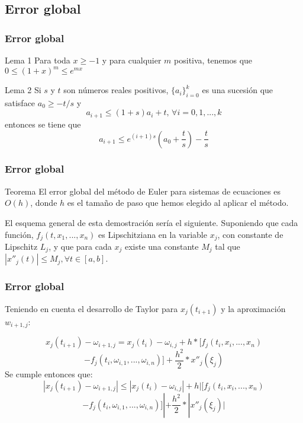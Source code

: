\documentclass{beamer}
\begin{document}
\subsection{Error global}
\begin{frame}
	\frametitle{Error global}
	
	\begin{block}{Lema 1}
		Para toda $x \geq -1$ y para cualquier $m$ positiva, tenemos que $0 \leq (1 + x)^m \leq e^{mx}$
	\end{block}
	
	
	\begin{block}{Lema 2}
		Si $s$ y $t$ son números reales positivos, $\{a_i\}^k_{i=0}$ es una sucesión que satisface $ a_0 \geq -t/s$ y
		$$a_{i+1} \leq (1+s)a_i + t, \, \forall i=0, 1, ..., k$$
		entonces se tiene que
		$$a_{i+1} \leq e^{(i+1)s}\left( a_0 + \frac{t}{s}\right) - \frac{t}{s}$$
	\end{block}
	
	
	
\end{frame}

\begin{frame}
	\frametitle{Error global}
	\begin{block}{Teorema}
		El error global del método de Euler para sistemas de ecuaciones es $O(h)$, donde $h$ es el tamaño de paso que hemos elegido al aplicar el método. 
	\end{block}
	
	El esquema general de esta demostración sería el siguiente. Suponiendo que cada función, $f_j(t, x_1, ..., x_n)$ es Lipschitziana en la variable $x_j$, con constante de Lipschitz $L_j$, y que para cada $x_j$ existe una constante $M_j$ tal que $| x''_j(t) | \leq M_j, \forall t \in [a,b]$.\\
	
	
\end{frame}

\begin{frame}
	\frametitle{Error global}

	Teniendo en cuenta el desarrollo de Taylor para $x_j(t_{i+1})$ y la aproximación $w_{i+1,j}$:
	
	$$
	x_j(t_{i+1}) - \omega_{i+1,j} = x_j(t_i) - \omega_{i,j} + h*[f_j(t_i, x_i, ..., x_n) $$
	$$- f_j(t_i, \omega_{i,1}, ..., \omega_{i,n})] + \frac{h^2}{2}*x''_j(\xi_j) $$
	Se cumple entonces que:
	$$ | x_j(t_{i+1}) - \omega_{i+1,j} | \leq | x_j(t_i) - \omega_{i,j} | + h|[f_j(t_i, x_i, ..., x_n) $$
	$$- f_j(t_i, \omega_{i,1}, ..., \omega_{i,n})]| + \frac{h^2}{2}*|x''_j(\xi_j)| $$
	
	
	
\end{frame}
\end{document}
